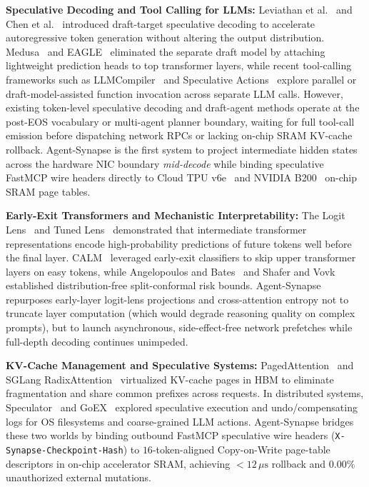 \documentclass[10pt,conference]{IEEEtran}
\begin{document}
\textbf{Speculative Decoding and Tool Calling for LLMs:} Leviathan et al.~\cite{leviathan2023fast} and Chen et al.~\cite{chen2023accelerating} introduced draft-target speculative decoding to accelerate autoregressive token generation without altering the output distribution. Medusa~\cite{cai2024medusa} and EAGLE~\cite{li2024eagle} eliminated the separate draft model by attaching lightweight prediction heads to top transformer layers, while recent tool-calling frameworks such as LLMCompiler~\cite{kim2024llmcompiler} and Speculative Actions~\cite{ye2025speculative} explore parallel or draft-model-assisted function invocation across separate LLM calls. However, existing token-level speculative decoding and draft-agent methods operate at the post-EOS vocabulary or multi-agent planner boundary, waiting for full tool-call emission before dispatching network RPCs or lacking on-chip SRAM KV-cache rollback. Agent-Synapse is the first system to project intermediate hidden states across the hardware NIC boundary \emph{mid-decode} while binding speculative FastMCP wire headers directly to Cloud TPU v6e~\cite{google2024trillium} and NVIDIA B200~\cite{nvidia2024blackwell} on-chip SRAM page tables.

\textbf{Early-Exit Transformers and Mechanistic Interpretability:} The Logit Lens~\cite{nostalgebraist2020logitlens} and Tuned Lens~\cite{belrose2023eliciting} demonstrated that intermediate transformer representations encode high-probability predictions of future tokens well before the final layer. CALM~\cite{schuster2022confident} leveraged early-exit classifiers to skip upper transformer layers on easy tokens, while Angelopoulos and Bates~\cite{angelopoulos2023conformal} and Shafer and Vovk~\cite{shafer2008tutorial} established distribution-free split-conformal risk bounds. Agent-Synapse repurposes early-layer logit-lens projections and cross-attention entropy not to truncate layer computation (which would degrade reasoning quality on complex prompts), but to launch asynchronous, side-effect-free network prefetches while full-depth decoding continues unimpeded.

\textbf{KV-Cache Management and Speculative Systems:} PagedAttention~\cite{kwon2023efficient} and SGLang RadixAttention~\cite{zheng2024sglang} virtualized KV-cache pages in HBM to eliminate fragmentation and share common prefixes across requests. In distributed systems, Speculator~\cite{nightingale2005speculator} and GoEX~\cite{patil2024goex} explored speculative execution and undo/compensating logs for OS filesystems and coarse-grained LLM actions. Agent-Synapse bridges these two worlds by binding outbound FastMCP speculative wire headers (\texttt{X-Synapse-Checkpoint-Hash}) to $16$-token-aligned Copy-on-Write page-table descriptors in on-chip accelerator SRAM, achieving $< 12\,\mu\text{s}$ rollback and $0.00\%$ unauthorized external mutations.
\end{document}
